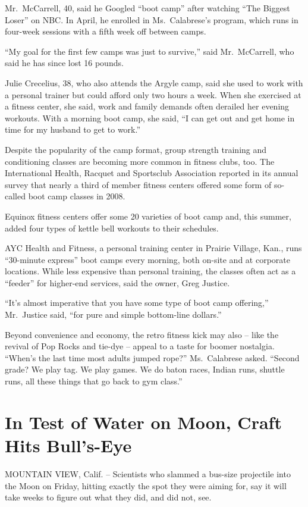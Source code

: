 ﻿\documentclass[12pt]{article}
\begin{document}
Mr.~McCarrell, 40, said he Googled ``boot camp'' after watching ``The Biggest Loser'' on NBC. In
April, he enrolled in Ms.~Calabrese's program, which runs in four-week sessions with a fifth week
off between camps.

``My goal for the first few camps was just to survive,'' said Mr.~McCarrell, who said he has since
lost 16 pounds.

Julie Crecelius, 38, who also attends the Argyle camp, said she used to work with a personal trainer
but could afford only two hours a week. When she exercised at a fitness center, she said, work and
family demands often derailed her evening workouts. With a morning boot camp, she said, ``I can get
out and get home in time for my husband to get to work.''

Despite the popularity of the camp format, group strength training and conditioning classes are
becoming more common in fitness clubs, too. The International Health, Racquet and Sportsclub
Association reported in its annual survey that nearly a third of member fitness centers offered some
form of so-called boot camp classes in 2008.

Equinox fitness centers offer some 20 varieties of boot camp and, this summer, added four types of
kettle bell workouts to their schedules.

AYC Health and Fitness, a personal training center in Prairie Village, Kan., runs ``30-minute
express'' boot camps every morning, both on-site and at corporate locations. While less expensive
than personal training, the classes often act as a ``feeder'' for higher-end services, said the
owner, Greg Justice.

``It's almost imperative that you have some type of boot camp offering,'' Mr.~Justice said, ``for
pure and simple bottom-line dollars.''

Beyond convenience and economy, the retro fitness kick may also -- like the revival of Pop Rocks and
tie-dye -- appeal to a taste for boomer nostalgia. ``When's the last time most adults jumped rope?''
Ms.~Calabrese asked. ``Second grade? We play tag. We play games. We do baton races, Indian runs,
shuttle runs, all these things that go back to gym class.''

\section{In Test of Water on Moon, Craft Hits Bull's-Eye}

\lettrine{M}{OUNTAIN} VIEW, Calif. -- Scientists who slammed a bus-size
projectile into the Moon on Friday, hitting exactly the spot they were aiming for, say it will take
weeks to figure out what they did, and did not, see.
\end{document}
